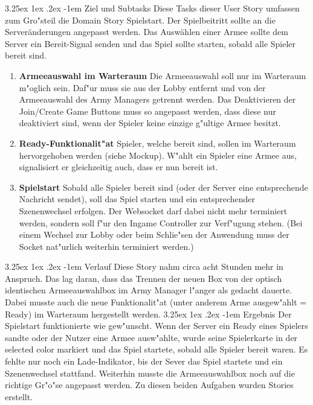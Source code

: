 \documentclass[12pt, titlepage]{scrartcl}
\makeatletter
\renewcommand\paragraph{\@startsection{paragraph}{5}{\z@}%
  {3.25ex \@plus1ex \@minus.2ex}%
  {-1em}%
  {\normalfont\normalsize\bfseries}}
\makeatother
\begin{document}
	            \paragraph{Ziel und Subtasks}
		         		Diese Tasks dieser User Story umfassen zum Gro"steil die Domain Story Spielstart. Der Spielbeitritt sollte an die Server\"anderungen angepasst werden. Das Ausw\"ahlen einer Armee sollte dem Server ein Bereit-Signal senden und das Spiel sollte starten, sobald alle Spieler bereit sind.
	                	\begin{enumerate}[label={}]
		                	\item \textbf{Armeeauswahl im Warteraum} \hspace{5pt} Die Armeeauswahl soll nur im Warteraum m"oglich sein. Daf"ur muss sie aus der Lobby entfernt und von der Armeeauswahl des Army Managers getrennt werden. Das Deaktivieren der Join/Create Game Buttons muss so angepasst werden, dass diese nur deaktiviert sind, wenn der Spieler keine einzige g"ultige Armee besitzt.
		                	\item \textbf{Ready-Funktionalit"at} \hspace{5pt} Spieler, welche bereit sind, sollen im Warteraum hervorgehoben werden (siehe Mockup). W"ahlt ein Spieler eine Armee aus, signalisiert er gleichzeitig auch, dass er nun bereit ist.
		                	\item \textbf{Spielstart} \hspace{5pt} Sobald alle Spieler bereit sind (oder der Server eine entsprechende Nachricht sendet), soll das Spiel starten und ein entsprechender Szenenwechsel erfolgen. Der Websocket darf dabei nicht mehr terminiert werden, sondern soll f"ur den Ingame Controller zur Verf"ugung stehen. (Bei einem Wechsel zur Lobby oder beim Schlie"sen der Anwendung muss der Socket nat"urlich weiterhin terminiert werden.)
	                \end{enumerate}
                \paragraph{Verlauf}
                	Diese Story nahm circa acht Stunden mehr in Anspruch. Das lag daran, dass das Trennen der neuen Box von der optisch identischen Armeeauswahlbox im Army Manager l"anger als gedacht dauerte. Dabei musste auch die neue Funktionalit"at (unter anderem Arme ausgew"ahlt = Ready) im Warteraum hergestellt werden.
                \paragraph{Ergebnis}
                	Der Spielstart funktionierte wie gew"unscht. Wenn der Server ein Ready eines Spielers sandte oder der Nutzer eine Armee ausw"ahlte, wurde seine Spielerkarte in der selected color markiert und das Spiel startete, sobald alle Spieler bereit waren. Es fehlte nur noch ein Lade-Indikator, bis der Sever das Spiel startete und ein Szenenwechsel stattfand. Weiterhin musste die Armeeauswahlbox noch auf die richtige Gr"o"se angepasst werden. Zu diesen beiden Aufgaben wurden Stories erstellt.
\end{document}
